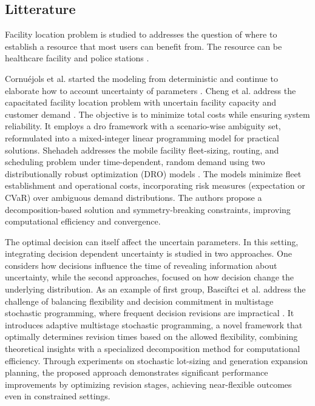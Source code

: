 \documentclass[12pt, letterpaper]{article}
\begin{document}
	\subsection*{Litterature}
	Facility location problem is studied to addresses the question of where to establish a resource that most users can benefit from. The resource can be healthcare facility \cite{ahmadi2017survey} and police stations \cite{borba2022optimizing}.
	
	Cornuéjols et al. started the modeling from deterministic and continue to elaborate how to account uncertainty of parameters \cite{cornuejols_uncapicitated_1983}. Cheng et al. address the capacitated facility location problem with uncertain facility capacity and customer demand \cite{cheng_distributionally_2024} . The objective is to minimize total costs while ensuring system reliability. It employs a \gls{dro} framework with a scenario-wise ambiguity set, reformulated into a mixed-integer linear programming model for practical solutions. Shehadeh addresses the mobile facility fleet-sizing, routing, and scheduling problem under time-dependent, random demand using two distributionally robust optimization (DRO) models \cite{shehadeh_distributionally_2023}. The models minimize fleet establishment and operational costs, incorporating risk measures (expectation or CVaR) over ambiguous demand distributions. The authors propose a decomposition-based solution and symmetry-breaking constraints, improving computational efficiency and convergence.

	The optimal decision can itself affect the uncertain parameters. In this setting, integrating decision dependent uncertainty is studied in two approaches. One considers how decisions influence the time of revealing information about uncertainty, while the second approaches, focused on how decision change the underlying distribution. As an example of first group, Basciftci et al. address the challenge of balancing flexibility and decision commitment in multistage stochastic programming, where frequent decision revisions are impractical \cite{basciftci2024adaptive}. It introduces adaptive multistage stochastic programming, a novel framework that optimally determines revision times based on the allowed flexibility, combining theoretical insights with a specialized decomposition method for computational efficiency. Through experiments on stochastic lot-sizing and generation expansion planning, the proposed approach demonstrates significant performance improvements by optimizing revision stages, achieving near-flexible outcomes even in constrained settings.
\end{document}
